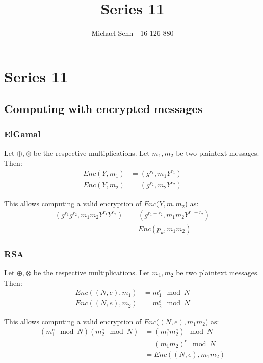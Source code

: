 \documentclass[a4paper]{scrreprt}
\title{Series 11}
\author{Michael Senn \maillink{michael.senn@students.unibe.ch} - 16-126-880}
\date{\printdate}
\begin{document}
\maketitle


\setcounter{chapter}{10}

\chapter{Series 11}

\section{Computing with encrypted messages}

\subsection{ElGamal}

Let $\oplus, \otimes$ be the respective multiplications. Let $m_1, m_2$ be two
plaintext messages. Then:
\begin{align*}
	Enc(Y, m_1) & = (g^{r_1}, m_1 Y^{r_1}) \\
	Enc(Y, m_2) & = (g^{r_2}, m_2 Y^{r_2})
\end{align*}

This allows computing a valid encryption of $Enc(Y, m_1 m_2$) as:
\begin{align*}
	(g^{r_1} g^{r_2}, m_1 m_2 Y^{r_1} Y^{r_2}) & = (g^{r_1 + r_2}, m_1 m_2 Y^{r_1 + r_2}) \\
						   & = Enc(p_k, m_1 m_2)
\end{align*}

\subsection{RSA}
\label{sec:malleability_rsa}

Let $\oplus, \otimes$ be the respective multiplications. Let $m_1, m_2$ be two
plaintext messages. Then:
\begin{align*}
	Enc((N, e), m_1) & = m_1^e \mod N \\
	Enc((N, e), m_2) & = m_2^e \mod N
\end{align*}

This allows computing a valid encryption of $Enc((N, e), m_1 m_2$) as:
\begin{align*}
	(m_1^e \mod N) (m_2^e \mod N) & = (m_1^e m_2^e) \mod N \\
				      & = (m_1 m_2)^e \mod N \\
				      & = Enc((N, e), m_1 m_2)
\end{align*}
\end{document}
